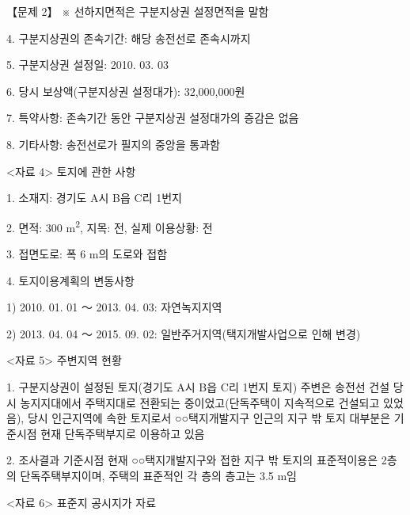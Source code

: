 \begin{longquestion}{【문제 2】}
※ 선하지면적은 구분지상권 설정면적을 말함 \par
4. 구분지상권의 존속기간: 해당 송전선로 존속시까지 \par
5. 구분지상권 설정일: 2010. 03. 03 \par
6. 당시 보상액(구분지상권 설정대가): 32,000,000원 \par
7. 특약사항: 존속기간 동안 구분지상권 설정대가의 증감은 없음 \par
8. 기타사항: 송전선로가 필지의 중앙을 통과함 \par
<자료 4> 토지에 관한 사항 \par
1. 소재지: 경기도 A시 B읍 C리 1번지 \par
2. 면적: 300 m\textsuperscript{2}, 지목: 전, 실제 이용상황: 전 \par
3. 접면도로: 폭 6 m의 도로와 접함 \par
4. 토지이용계획의 변동사항 \par
1) 2010. 01. 01 ～ 2013. 04. 03: 자연녹지지역 \par
2) 2013. 04. 04 ～ 2015. 09. 02: 일반주거지역(택지개발사업으로 인해 변경) \par
<자료 5> 주변지역 현황 \par
1. 구분지상권이 설정된 토지(경기도 A시 B읍 C리 1번지 토지) 주변은 송전선 건설 당시 농지지대에서 주택지대로 전환되는 중이었고(단독주택이 지속적으로 건설되고 있었음), 당시 인근지역에 속한 토지로서 ○○택지개발지구 인근의 지구 밖 토지 대부분은 기준시점 현재 단독주택부지로 이용하고 있음 \par
2. 조사결과 기준시점 현재 ○○택지개발지구와 접한 지구 밖 토지의 표준적이용은 2층의 단독주택부지이며, 주택의 표준적인 각 층의 층고는 3.5 m임 \par
<자료 6> 표준지 공시지가 자료 \par
{\small\centering
{}\par}


\end{longquestion}
